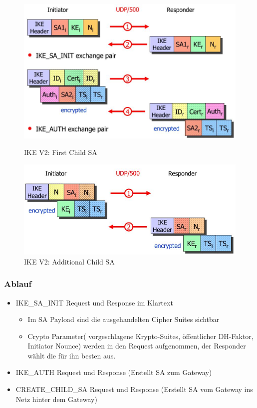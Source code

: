 \begin{figure}[ht!]
	\centering
	\begin{minipage}[t]{0.4\textwidth}
		\centering
		\includegraphics[width=\linewidth]{images/ike_v2}
		\caption{IKE V2: First Child SA}
		\label{fig:ikev2}
	\end{minipage}
	\begin{minipage}[t]{0.4\textwidth}
		\centering
		\includegraphics[width=\linewidth]{images/ike_v2_additional_sa}
		\caption{IKE V2: Additional Child SA}
		\label{fig:ikev2additionalsa}
	\end{minipage}
\end{figure}

\subsubsection{Ablauf}
\begin{itemize}
	\item IKE\_SA\_INIT Request und Response im Klartext
	\begin{itemize}
		\item Im SA Payload sind die ausgehandelten Cipher Suites sichtbar
		\item Crypto Parameter( vorgeschlagene Krypto-Suites, öffentlicher DH-Faktor, Initiator Nounce) werden in den Request aufgenommen, der Responder wählt die für ihn besten aus.
	\end{itemize}
	\item IKE\_AUTH Request und Response (Erstellt SA zum Gateway)
	\item CREATE\_CHILD\_SA Request und Response (Erstellt SA vom Gateway ins Netz hinter dem Gateway)
\end{itemize}

